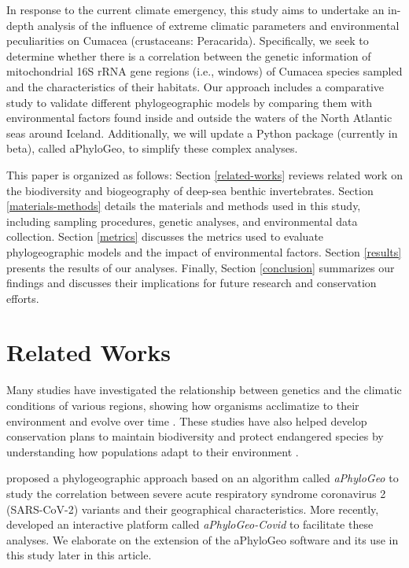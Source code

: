 In response to the current climate emergency, this study aims to undertake an in-depth analysis of the influence of extreme climatic parameters and environmental peculiarities on Cumacea (crustaceans: Peracarida). Specifically, we seek to determine whether there is a correlation between the genetic information of mitochondrial 16S rRNA gene regions (i.e., windows) of Cumacea species sampled and the characteristics of their habitats. Our approach includes a comparative study to validate different phylogeographic models by comparing them with environmental factors found inside and outside the waters of the North Atlantic seas around Iceland. Additionally, we will update a Python package (currently in beta), called aPhyloGeo, to simplify these complex analyses.

This paper is organized as follows: Section \autoref{related-works} reviews related work on the biodiversity and biogeography of deep-sea benthic invertebrates. Section \autoref{materials-methods} details the materials and methods used in this study, including sampling procedures, genetic analyses, and environmental data collection. Section \autoref{metrics} discusses the metrics used to evaluate phylogeographic models and the impact of environmental factors. Section \autoref{results} presents the results of our analyses. Finally, Section \autoref{conclusion} summarizes our findings and discusses their implications for future research and conservation efforts.

\section{Related Works}\label{related-works}
Many studies have investigated the relationship between genetics and the climatic conditions of various regions, showing how organisms acclimatize to their environment and evolve over time \citep{fc_genomic_2012}. These studies have also helped develop conservation plans to maintain biodiversity and protect endangered species by understanding how populations adapt to their environment \citep{balkenhol_identifying_2009}.

\cite{koshkarov_phylogeography_2022} proposed a phylogeographic approach based on an algorithm called \textit{aPhyloGeo} to study the correlation between severe acute respiratory syndrome coronavirus 2 (SARS-CoV-2) variants and their geographical characteristics. More recently, \cite{li_aphylogeo-covid_2023} developed an interactive platform called \textit{aPhyloGeo-Covid} to facilitate these analyses. We elaborate on the extension of the aPhyloGeo software and its use in this study later in this article.

